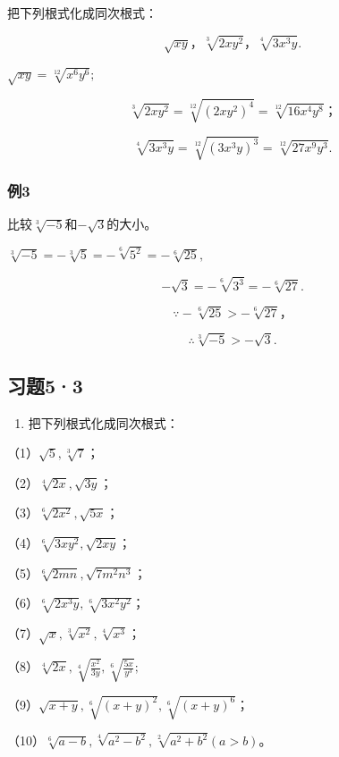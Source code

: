 把下列根式化成同次根式：

\[
\sqrt {x y}\text{，} \sqrt[3]{2 x y ^ {2}}\text{，} \sqrt[4]{3 x ^ {3} y}.
\]

 \(\sqrt{xy} = \sqrt[12]{x^6y^6};\)

\[
\sqrt[3]{2 x y ^ {2}} = \sqrt[12]{(2 x y ^ {2}) ^ {4}} = \sqrt[12]{16 x ^ {4} y ^ {8}}\text{；}
\]

\[
\sqrt[4]{3 x ^ {3} y} = \sqrt[12]{(3 x ^ {3} y) ^ {3}} = \sqrt[12]{27 x ^ {9} y ^ {3}}.
\]

\subsubsection{例3}

比较\(\sqrt[3]{-5}\)和\(-\sqrt{3}\)的大小。

\(\sqrt[3]{-5} = -\sqrt[3]{5} = -\sqrt[6]{5^2} = -\sqrt[6]{25},\)

\[
- \sqrt {3} = - \sqrt[6]{3 ^ {3}} = - \sqrt[6]{27}.
\]

\[
\because - \sqrt[6]{25} > - \sqrt[6]{27}\text{，}
\]

\[
\therefore \sqrt[3]{- 5} > - \sqrt {3}.
\]

\subsection{习题5·3}

\begin{enumerate}
\item
  把下列根式化成同次根式：
\end{enumerate}

（1）\(\sqrt{5}, \sqrt[3]{7}\)；

（2）\(\sqrt[4]{2x}, \sqrt{3y}\)；

（3）\(\sqrt[6]{2x^2}, \sqrt{5x}\)；

（4）\(\sqrt[6]{3xy^2}, \sqrt{2xy}\)；

（5）\(\sqrt[6]{2mn}, \sqrt{7m^2n^3}\)；

（6）\(\sqrt[6]{2x^3y}, \sqrt[6]{3x^2y^2}\)；

（7）\(\sqrt{x}, \sqrt[3]{x^2}, \sqrt[4]{x^3}\)；

（8）\(\sqrt[4]{2x}, \sqrt[4]{\frac{x^2}{3y}}, \sqrt[6]{\frac{5x}{y^3}};\)

（9）\(\sqrt{x + y}, \sqrt[6]{(x + y)^2}, \sqrt[6]{(x + y)^6}\)；

（10）\(\sqrt[6]{a - b}, \sqrt[4]{a^2 - b^2}, \sqrt[2]{a^2 + b^2} (a > b)\)。

